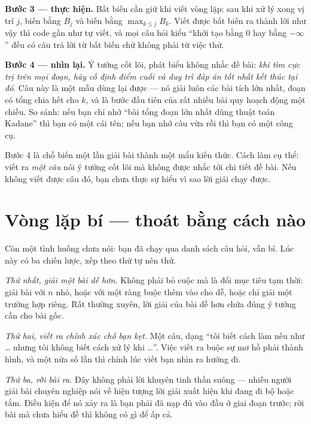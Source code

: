 \documentclass[../../algorithm.tex]{subfiles}
\begin{document}
\textbf{Bước 3 --- thực hiện.} Bất biến cần giữ khi viết vòng lặp: sau khi xử lý xong vị trí \(j\), biến  bằng \(B_j\) và biến  bằng \(\max_{k \le j} B_k\). Viết được bất biến ra thành lời như vậy thì code gần như tự viết, và mọi câu hỏi kiểu ``khởi tạo bằng 0 hay bằng \(-\infty\)'' đều có câu trả lời từ bất biến chứ không phải từ việc thử.

\textbf{Bước 4 --- nhìn lại.} Ý tưởng cốt lõi, phát biểu không nhắc đề bài: \emph{khi tìm cực trị trên mọi đoạn, hãy cố định điểm cuối và duy trì đáp án tốt nhất kết thúc tại đó}. Câu này là một mẫu dùng lại được --- nó giải luôn các bài tích lớn nhất, đoạn có tổng chia hết cho \(k\), và là bước đầu tiên của rất nhiều bài quy hoạch động một chiều. So sánh: nếu bạn chỉ nhớ ``bài tổng đoạn lớn nhất dùng thuật toán Kadane'' thì bạn có một cái tên; nếu bạn nhớ câu vừa rồi thì bạn có một công cụ.

\begin{cannho}
Bước 4 là chỗ biến một lần giải bài thành một mẩu kiến thức. Cách làm cụ thể: viết ra \emph{một câu} nói ý tưởng cốt lõi mà không được nhắc tới chi tiết đề bài. Nếu không viết được câu đó, bạn chưa thực sự hiểu vì sao lời giải chạy được.
\end{cannho}

\section{Vòng lặp bí --- thoát bằng cách nào}

Còn một tình huống chưa nói: bạn đã chạy qua danh sách câu hỏi, vẫn bí. Lúc này có ba chiến lược, xếp theo thứ tự nên thử.

\emph{Thứ nhất, giải một bài dễ hơn.} Không phải bỏ cuộc mà là đổi mục tiêu tạm thời: giải bài với \(n\) nhỏ, hoặc với một ràng buộc thêm vào cho dễ, hoặc chỉ giải một trường hợp riêng. Rất thường xuyên, lời giải của bài dễ hơn chứa đúng ý tưởng cần cho bài gốc.

\emph{Thứ hai, viết ra chính xác chỗ bạn kẹt.} Một câu, dạng ``tôi biết cách làm nếu như \dots{} nhưng tôi không biết cách xử lý khi \dots''. Việc viết ra buộc sự mơ hồ phải thành hình, và một nửa số lần thì chính lúc viết bạn nhìn ra hướng đi.

\emph{Thứ ba, rời bài ra.} Đây không phải lời khuyên tinh thần suông --- nhiều người giải bài chuyên nghiệp nói về hiện tượng lời giải xuất hiện khi đang đi bộ hoặc tắm. Điều kiện để nó xảy ra là bạn phải đã nạp đủ vào đầu ở giai đoạn trước; rời bài mà chưa hiểu đề thì không có gì để ấp cả.
\end{document}

